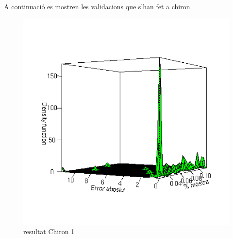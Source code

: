 \documentclass[titlepage,a4paper,12pt]{book}
\begin{document}



	A continuació es mostren les validacions que s'han fet a chiron.  


	\begin{figure}[tbp]
		\begin{center}
			\includegraphics[scale=0.75]{chiron/rgrau1.png}
		\end{center}
		\caption{resultat Chiron 1}
		\label{fig:resChir1}
	\end{figure}
\end{document}

